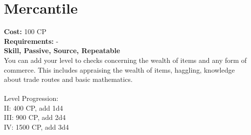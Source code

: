 \section{Mercantile}
\textbf{Cost:} 100 CP\\
\textbf{Requirements:} -\\
\textbf{Skill, Passive, Source, Repeatable}\\
You can add your level to checks concerning the wealth of items and any form of commerce. This includes appraising the wealth of items, haggling, knowledge about trade routes and basic mathematics.\\
\\
Level Progression:\\
II: 400 CP, add 1d4\\
III: 900 CP, add 2d4\\
IV: 1500 CP, add 3d4\\